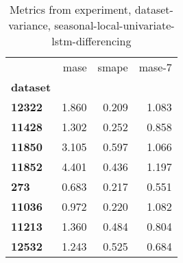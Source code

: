 \begin{table}[h]
\centering
\caption{Metrics from experiment, dataset-variance, seasonal-local-univariate-lstm-differencing}
\label{table:seasonal-local-univariate-lstm-differencing-dataset-variance}
\begin{tabular}{lrrr}
\toprule
{} &   mase &  smape &  mase-7 \\
\textbf{dataset} &        &        &         \\
\midrule
\textbf{12322  } &  1.860 &  0.209 &   1.083 \\
\textbf{11428  } &  1.302 &  0.252 &   0.858 \\
\textbf{11850  } &  3.105 &  0.597 &   1.066 \\
\textbf{11852  } &  4.401 &  0.436 &   1.197 \\
\textbf{273    } &  0.683 &  0.217 &   0.551 \\
\textbf{11036  } &  0.972 &  0.220 &   1.082 \\
\textbf{11213  } &  1.360 &  0.484 &   0.804 \\
\textbf{12532  } &  1.243 &  0.525 &   0.684 \\
\bottomrule
\end{tabular}
\end{table}
